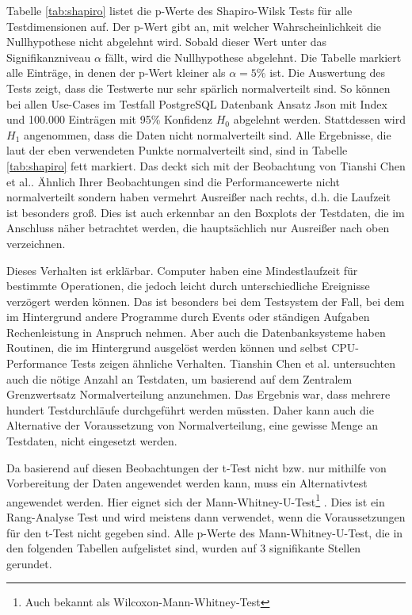 Tabelle \ref{tab:shapiro} listet die p-Werte des Shapiro-Wilsk Tests für alle Testdimensionen auf. Der p-Wert gibt an, mit welcher Wahrscheinlichkeit die Nullhypothese nicht abgelehnt wird. Sobald dieser Wert unter das Signifikanzniveau $\alpha$ fällt, wird die Nullhypothese abgelehnt. Die Tabelle markiert alle Einträge, in denen der p-Wert kleiner als \(\alpha = 5\%\) ist.
Die Auswertung des Tests zeigt, dass die Testwerte nur sehr spärlich normalverteilt sind. So können bei allen Use-Cases im Testfall PostgreSQL Datenbank Ansatz Json mit Index und 100.000 Einträgen mit 95\% Konfidenz \textbf{$H_{0}$} abgelehnt werden. Stattdessen wird \textbf{$H_{1}$} angenommen, dass die Daten nicht normalverteilt sind. Alle Ergebnisse, die laut der eben verwendeten Punkte normalverteilt sind, sind in Tabelle \ref{tab:shapiro} fett markiert.
Das deckt sich mit der Beobachtung von Tianshi Chen et al.\cite{Chen.2015}. Ähnlich Ihrer Beobachtungen sind die Performancewerte nicht normalverteilt sondern haben vermehrt Ausreißer nach rechts, d.h. die Laufzeit ist besonders groß. Dies ist auch erkennbar an den Boxplots der Testdaten, die im Anschluss näher betrachtet werden, die hauptsächlich nur Ausreißer nach oben verzeichnen.

Dieses Verhalten ist erklärbar. Computer haben eine Mindestlaufzeit für bestimmte Operationen, die jedoch leicht durch unterschiedliche Ereignisse verzögert werden können. Das ist besonders bei dem Testsystem der Fall, bei dem im Hintergrund andere Programme durch Events oder ständigen Aufgaben Rechenleistung in Anspruch nehmen. Aber auch die Datenbanksysteme haben Routinen, die im Hintergrund ausgelöst werden können und selbst CPU-Performance Tests zeigen ähnliche Verhalten. Tianshin Chen et al.\cite{Chen.2015} untersuchten auch die nötige Anzahl an Testdaten, um basierend auf dem Zentralem Grenzwertsatz Normalverteilung anzunehmen. Das Ergebnis war, dass mehrere hundert Testdurchläufe durchgeführt werden müssten. Daher kann auch die Alternative der Voraussetzung von Normalverteilung, eine gewisse Menge an Testdaten, nicht eingesetzt werden.

Da basierend auf diesen Beobachtungen der t-Test nicht bzw. nur mithilfe von Vorbereitung der Daten angewendet werden kann, muss ein Alternativtest angewendet werden. Hier eignet sich der Mann-Whitney-U-Test\footnote{Auch bekannt als Wilcoxon-Mann-Whitney-Test} \cite{Bridge.1999}. Dies ist ein Rang-Analyse Test und wird meistens dann verwendet, wenn die Voraussetzungen für den t-Test nicht gegeben sind. Alle p-Werte des Mann-Whitney-U-Test, die in den folgenden Tabellen aufgelistet sind, wurden auf 3 signifikante Stellen gerundet.

